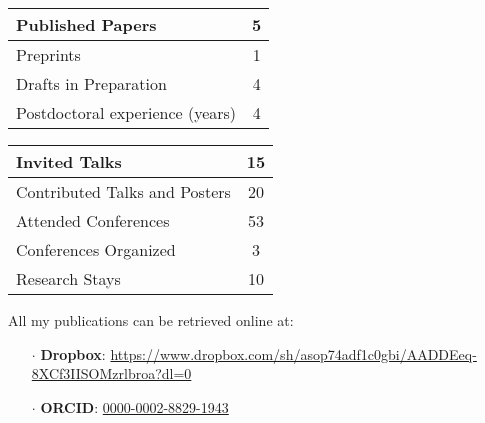 \documentclass[a4paper]{article}
\begin{document}
		\begin{minipage}[t]{0.45\columnwidth}
		\center
	\begin{tabularx}{\linewidth}{|X|c|}
	\hline
	
	Published Papers & 5 \\
	\hline
	
	Preprints & 1 \\
	\hline
	
	Drafts in Preparation & 4 \\
	\hline
	
	Postdoctoral experience (years) & 4 \\
	\hline
	
	\end{tabularx}
		\end{minipage} 
		\hfill	
		\begin{minipage}[t]{0.45\columnwidth}
		\center
	\begin{tabularx}{\linewidth}{|X|c|}
	\hline
	
	Invited Talks & 15 \\
	\hline
	
	Contributed Talks and Posters & 20 \\
	\hline
	
	Attended Conferences & 53 \\
	\hline

	Conferences Organized & 3 \\
	
	Research Stays & 10 \\
	\hline
	
	\end{tabularx}
		\end{minipage} 	
	\vspace{1em}	
	
	
	
	All my publications can be retrieved online at:
	\begin{itemize}[leftmargin=*, itemsep=0pt, parsep=0pt, topsep=0pt, partopsep=0pt]
		\item[$\cdot$] \textbf{Dropbox}: \url{https://www.dropbox.com/sh/asop74adf1c0gbi/AADDEeq-8XCf3IISOMzrlbroa?dl=0}
		\item[$\cdot$] \textbf{ORCID}: \href{https://orcid.org/0000-0002-8829-1943}{0000-0002-8829-1943}
	\end{itemize}
	\vspace{1em}


\end{document}
